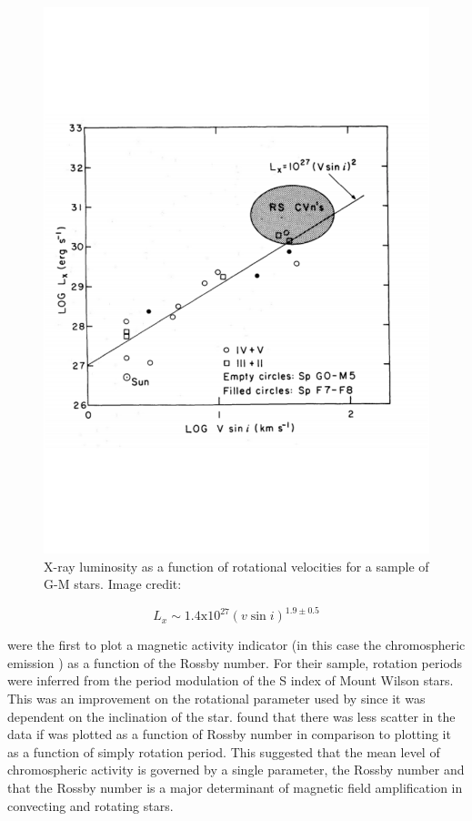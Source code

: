 \begin{figure}
    \centering
    \includegraphics[scale=0.5]{Figures/2-Historical_overview/p81_fig_5.pdf}
    \caption[First plot of magnetic activity as a function of rotational velocity]{X-ray luminosity as a function of rotational velocities for a sample of G-M stars. Image credit: \citet{Pallavicini_etal_1981}}
    \label{fig:pallavicini_etal_1981_plot}
\end{figure}

\begin{equation}
    L_{x} \sim 1.4\text{x}10^{27}(v\sin i)^{1.9 \pm 0.5}
    \label{Eq:pallavicini_81}
\end{equation}

\citet{Noyes_etal_1984} were the first to plot a magnetic activity indicator (in this case the chromospheric emission \Rprime) as a function of the Rossby number. For their sample, rotation periods were inferred from the period modulation of the S index of Mount Wilson stars. This was an improvement on the rotational parameter used by \citet{Pallavicini_etal_1981} since it was dependent on the inclination of the star. \citet{Noyes_etal_1984} found that there was less scatter in the data if \Rprime was plotted as a function of Rossby number in comparison to plotting it as a function of simply rotation period. This suggested that the mean level of chromospheric activity is governed by a single parameter, the Rossby number and that the Rossby number is a major determinant of magnetic field amplification in convecting and rotating stars.

